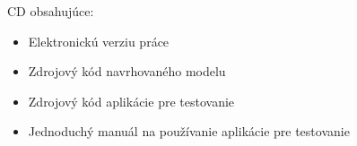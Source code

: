 CD obsahujúce:
\begin{itemize}
\item Elektronickú verziu práce
\item Zdrojový kód navrhovaného modelu
\item Zdrojový kód aplikácie pre testovanie
\item Jednoduchý manuál na používanie aplikácie pre testovanie
\end{itemize}
